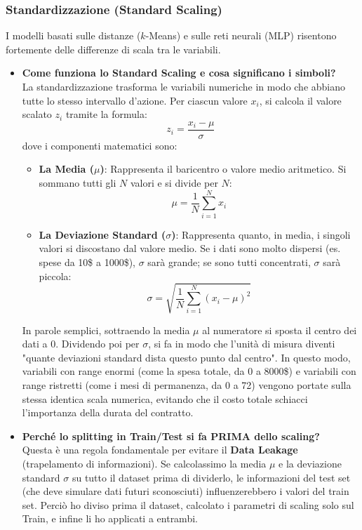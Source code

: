 \documentclass[a4paper,11pt]{article}
\begin{document}
\subsubsection{Standardizzazione (Standard Scaling)}
I modelli basati sulle distanze ($k$-Means) e sulle reti neurali (MLP) risentono fortemente delle differenze di scala tra le variabili.
\begin{itemize}
    \item \textbf{Come funziona lo Standard Scaling e cosa significano i simboli?}\\
    La standardizzazione trasforma le variabili numeriche in modo che abbiano tutte lo stesso intervallo d'azione. Per ciascun valore $x_i$, si calcola il valore scalato $z_i$ tramite la formula:
    \begin{equation}
        z_i = \frac{x_i - \mu}{\sigma}
    \end{equation}
    dove i componenti matematici sono:
    \begin{itemize}
        \item \textbf{La Media ($\mu$)}: Rappresenta il baricentro o valore medio aritmetico. Si sommano tutti gli $N$ valori e si divide per $N$:
        \begin{equation}
            \mu = \frac{1}{N}\sum_{i=1}^{N} x_i
        \end{equation}
        \item \textbf{La Deviazione Standard ($\sigma$)}: Rappresenta quanto, in media, i singoli valori si discostano dal valore medio. Se i dati sono molto dispersi (es. spese da 10\$ a 1000\$), $\sigma$ sarà grande; se sono tutti concentrati, $\sigma$ sarà piccola:
        \begin{equation}
            \sigma = \sqrt{\frac{1}{N}\sum_{i=1}^{N} (x_i - \mu)^2}
        \end{equation}
    \end{itemize}
    In parole semplici, sottraendo la media $\mu$ al numeratore si sposta il centro dei dati a $0$. Dividendo poi per $\sigma$, si fa in modo che l'unità di misura diventi "quante deviazioni standard dista questo punto dal centro". In questo modo, variabili con range enormi (come la spesa totale, da 0 a 8000\$) e variabili con range ristretti (come i mesi di permanenza, da 0 a 72) vengono portate sulla stessa identica scala numerica, evitando che il costo totale schiacci l'importanza della durata del contratto.
    \item \textbf{Perché lo splitting in Train/Test si fa PRIMA dello scaling?}\\
    Questa è una regola fondamentale per evitare il \textbf{Data Leakage} (trapelamento di informazioni). Se calcolassimo la media $\mu$ e la deviazione standard $\sigma$ su tutto il dataset prima di dividerlo, le informazioni del test set (che deve simulare dati futuri sconosciuti) influenzerebbero i valori del train set. Perciò ho diviso prima il dataset, calcolato i parametri di scaling solo sul Train, e infine li ho applicati a entrambi.
\end{itemize}
\end{document}
